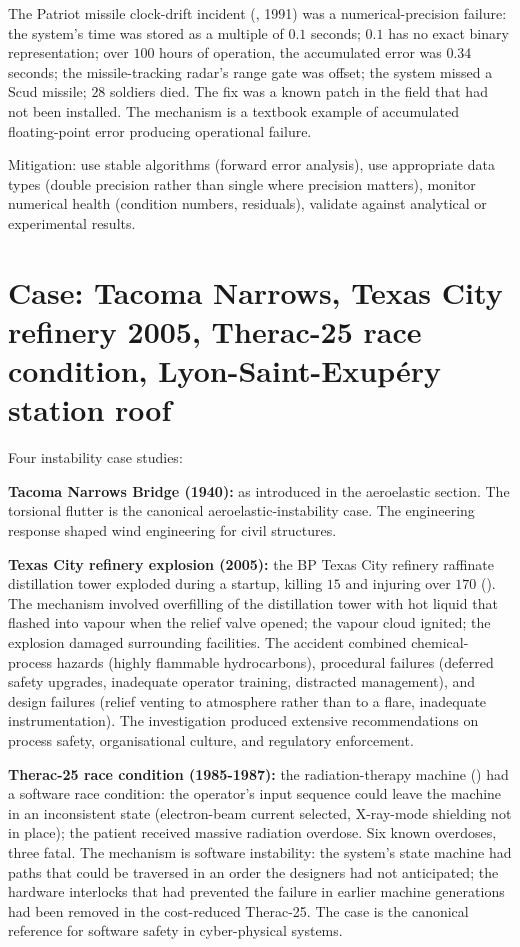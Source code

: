 The Patriot missile clock-drift incident (\cite{acc:gao-patriot-1992}, 1991) was a numerical-precision failure: the system's time was stored as a multiple of $0.1$ seconds; $0.1$ has no exact binary representation; over $100$ hours of operation, the accumulated error was $0.34$ seconds; the missile-tracking radar's range gate was offset; the system missed a Scud missile; $28$ soldiers died. The fix was a known patch in the field that had not been installed. The mechanism is a textbook example of accumulated floating-point error producing operational failure.

Mitigation: use stable algorithms (forward error analysis), use appropriate data types (double precision rather than single where precision matters), monitor numerical health (condition numbers, residuals), validate against analytical or experimental results.

\section{Case: Tacoma Narrows, Texas City refinery 2005, Therac-25 race condition, Lyon-Saint-Exup\'ery station roof}

Four instability case studies:

\textbf{Tacoma Narrows Bridge (1940):} as introduced in the aeroelastic section. The torsional flutter is the canonical aeroelastic-instability case. The engineering response shaped wind engineering for civil structures.

\textbf{Texas City refinery explosion (2005):} the BP Texas City refinery raffinate distillation tower exploded during a startup, killing $15$ and injuring over $170$ (\cite{acc:csb-bp-texas-city-2007}). The mechanism involved overfilling of the distillation tower with hot liquid that flashed into vapour when the relief valve opened; the vapour cloud ignited; the explosion damaged surrounding facilities. The accident combined chemical-process hazards (highly flammable hydrocarbons), procedural failures (deferred safety upgrades, inadequate operator training, distracted management), and design failures (relief venting to atmosphere rather than to a flare, inadequate instrumentation). The investigation produced extensive recommendations on process safety, organisational culture, and regulatory enforcement.

\textbf{Therac-25 race condition (1985-1987):} the radiation-therapy machine (\cite{paper:leveson-turner1993}) had a software race condition: the operator's input sequence could leave the machine in an inconsistent state (electron-beam current selected, X-ray-mode shielding not in place); the patient received massive radiation overdose. Six known overdoses, three fatal. The mechanism is software instability: the system's state machine had paths that could be traversed in an order the designers had not anticipated; the hardware interlocks that had prevented the failure in earlier machine generations had been removed in the cost-reduced Therac-25. The case is the canonical reference for software safety in cyber-physical systems.

